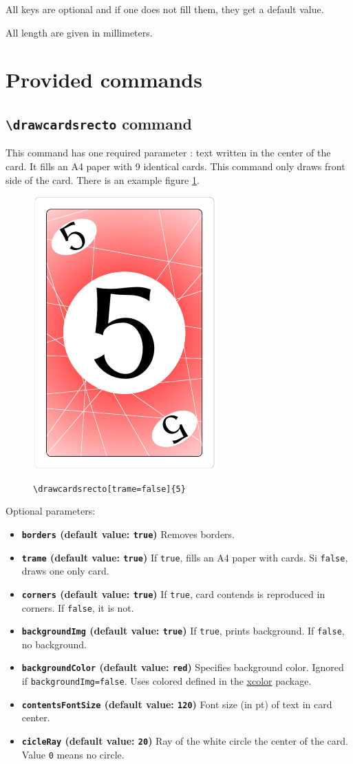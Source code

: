 \documentclass[a4paper, 12pt]{article}
\newcommand{\key}[3]{\textbf{\texttt{#1} (default value: \texttt{#2})} #3}
\newcommand{\commande}[1]{\texttt{\textbackslash#1}}
\begin{document}
All keys are optional and if one does not fill them, they get a default value.

All length are given in millimeters.

\section{Provided commands}
	\subsection{\commande{drawcardsrecto} command}
This command has one required parameter : text written in the center of the card. It fills an A4 paper with 9 identical cards. This command only draws front side of the card. There is an example figure \ref{fig:recto}.
\begin{figure}[h]\begin{center}
	\caption{\commande{drawcardsrecto[trame=false]\{5\}}}
	\includegraphics{screen01.png}\label{fig:recto}
\end{center}\end{figure}

Optional parameters:
\begin{itemize}
	\item \key{borders}{true}{Removes borders.}
	\item \key{trame}{true}{If \texttt{true}, fills an A4 paper with cards. Si \texttt{false}, draws one only card.}
	\item \key{corners}{true}{If \texttt{true}, card contends is reproduced in corners. If \texttt{false}, it is not.}
	\item \key{backgroundImg}{true}{If \texttt{true}, prints background. If \texttt{false}, no background.}
	\item \key{backgroundColor}{red}{Specifies background color. Ignored if \texttt{backgroundImg=false}. Uses colored defined in the \href{https://www.ctan.org/pkg/xcolor}{xcolor} package.}
	\item \key{contentsFontSize}{120}{Font size (in pt) of text in card center.}
	\item \key{cicleRay}{20}{Ray of the white circle the center of the card. Value \texttt 0 means no circle.}
\end{itemize}
\end{document}
